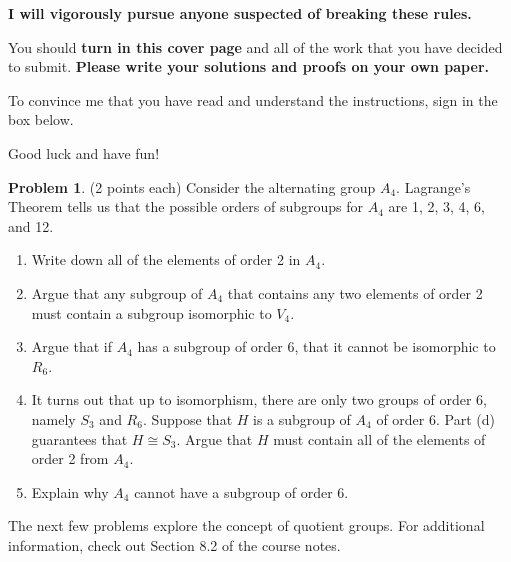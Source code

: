 \documentclass[11pt]{article}
\theoremstyle{definition}
\newtheorem{problem}[theorem]{Problem}
\begin{document}
\begin{center}
\textbf{I will vigorously pursue anyone suspected of breaking these rules.}
\end{center}

\bigskip

You should \textbf{turn in this cover page} and all of the work that you have decided to submit. \textbf{Please write your solutions and proofs on your own paper.}

\bigskip

To convince me that you have read and understand the instructions, sign in the box below.

\bigskip


\bigskip

Good luck and have fun!

\newpage

\begin{problem}
(2 points each) Consider the alternating group $A_4$.  Lagrange's Theorem tells us that the possible orders of subgroups for $A_4$ are 1, 2, 3, 4, 6, and 12.
\begin{enumerate}[label=\rm{(\alph*)}]
\item Write down all of the elements of order 2 in $A_4$.
\item Argue that any subgroup of $A_4$ that contains any two elements of order 2 must contain a subgroup isomorphic to $V_4$.
\item Argue that if $A_4$ has a subgroup of order 6, that it cannot be isomorphic to $R_6$.
\item It turns out that up to isomorphism, there are only two groups of order 6, namely $S_3$ and $R_6$.  Suppose that $H$ is a subgroup of $A_4$ of order 6.  Part (d) guarantees that $H\cong S_3$.   Argue that $H$ must contain all of the elements of order 2 from $A_4$.
\item Explain why $A_4$ cannot have a subgroup of order 6. 
\end{enumerate}
\end{problem}

The next few problems explore the concept of quotient groups.  For additional information, check out Section 8.2 of the course notes. 
\end{document}
